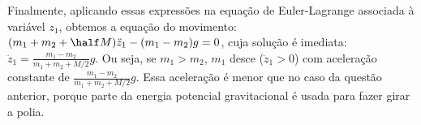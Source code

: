 \begin{question}
\begin{solution}
      Finalmente, aplicando essas expressões na equação de Euler-Lagrange associada à variável $z_1$, obtemos a equação do movimento: $(m_1 + m_2 + \half M) \ddot z_1 - (m_1 - m_2)g = 0$, cuja solução é imediata: $\ddot z_1 = \frac{m_1 - m_2}{m_1 + m_2 + M/2}g$.
      Ou seja, se $m_1 > m_2$, $m_1$ desce ($\ddot z_1 > 0$) com aceleração constante de $\frac{m_1 - m_2}{m_1 + m_2 + M/2}g$.
      Essa aceleração é menor que no caso da questão anterior, porque parte da energia potencial gravitacional é usada para fazer girar a polia.
    \end{solution}
\end{question}